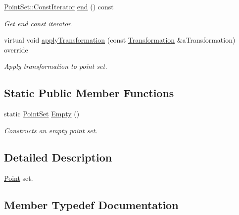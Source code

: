 \begin{DoxyCompactItemize}
\hyperlink{classlibrary_1_1math_1_1geom_1_1d3_1_1objects_1_1_point_set_a7b7fade95484b653ec27ad082ffc8064}{Point\+Set\+::\+Const\+Iterator} \hyperlink{classlibrary_1_1math_1_1geom_1_1d3_1_1objects_1_1_point_set_ae9f66fcbe937005a418238929048f587}{end} () const
\begin{DoxyCompactList}\small\item\em Get end const iterator. \end{DoxyCompactList}\item 
virtual void \hyperlink{classlibrary_1_1math_1_1geom_1_1d3_1_1objects_1_1_point_set_aa747a6169cd9c14011c8249a728c3c48}{apply\+Transformation} (const \hyperlink{classlibrary_1_1math_1_1geom_1_1d3_1_1_transformation}{Transformation} \&a\+Transformation) override
\begin{DoxyCompactList}\small\item\em Apply transformation to point set. \end{DoxyCompactList}\end{DoxyCompactItemize}
\subsection*{Static Public Member Functions}
\begin{DoxyCompactItemize}
\item 
static \hyperlink{classlibrary_1_1math_1_1geom_1_1d3_1_1objects_1_1_point_set}{Point\+Set} \hyperlink{classlibrary_1_1math_1_1geom_1_1d3_1_1objects_1_1_point_set_af4b649e6c97106bf9f54b2213f10484a}{Empty} ()
\begin{DoxyCompactList}\small\item\em Constructs an empty point set. \end{DoxyCompactList}\end{DoxyCompactItemize}


\subsection{Detailed Description}
\hyperlink{classlibrary_1_1math_1_1geom_1_1d3_1_1objects_1_1_point}{Point} set. 

\subsection{Member Typedef Documentation}
\mbox{\label{classlibrary_1_1math_1_1geom_1_1d3_1_1objects_1_1_point_set_a7b7fade95484b653ec27ad082ffc8064}} 
